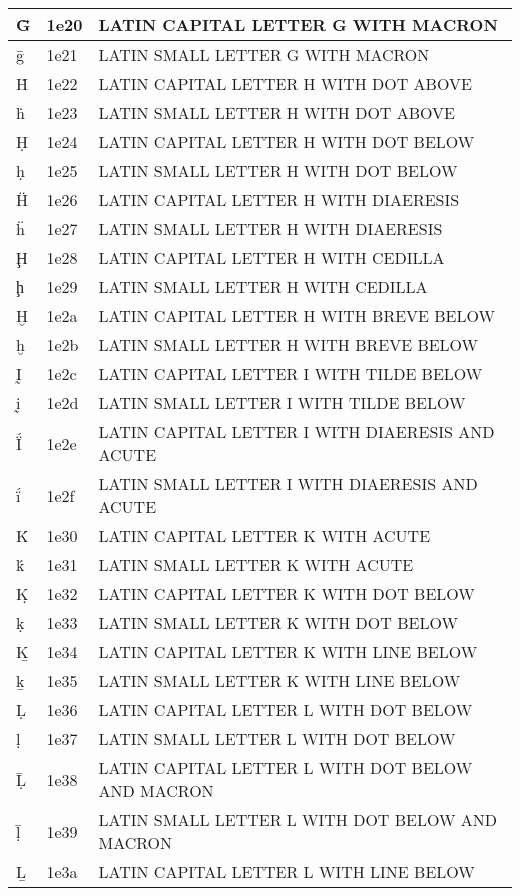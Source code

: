 \documentclass[12pt,letterpaper,openany]{book}
\begin{document}
\begin{center}
\begin{supertabular}{|m{0.25in}|m{0.5in}|m{4in}|}
Ḡ & 1e20 & LATIN CAPITAL LETTER G WITH MACRON\\\hline
ḡ & 1e21 & LATIN SMALL LETTER G WITH MACRON\\\hline
Ḣ & 1e22 & LATIN CAPITAL LETTER H WITH DOT ABOVE\\\hline
ḣ & 1e23 & LATIN SMALL LETTER H WITH DOT ABOVE\\\hline
Ḥ & 1e24 & LATIN CAPITAL LETTER H WITH DOT BELOW\\\hline
ḥ & 1e25 & LATIN SMALL LETTER H WITH DOT BELOW\\\hline
Ḧ & 1e26 & LATIN CAPITAL LETTER H WITH DIAERESIS\\\hline
ḧ & 1e27 & LATIN SMALL LETTER H WITH DIAERESIS\\\hline
Ḩ & 1e28 & LATIN CAPITAL LETTER H WITH CEDILLA\\\hline
ḩ & 1e29 & LATIN SMALL LETTER H WITH CEDILLA\\\hline
Ḫ & 1e2a & LATIN CAPITAL LETTER H WITH BREVE BELOW\\\hline
ḫ & 1e2b & LATIN SMALL LETTER H WITH BREVE BELOW\\\hline
Ḭ & 1e2c & LATIN CAPITAL LETTER I WITH TILDE BELOW\\\hline
ḭ & 1e2d & LATIN SMALL LETTER I WITH TILDE BELOW\\\hline
Ḯ & 1e2e & LATIN CAPITAL LETTER I WITH DIAERESIS AND ACUTE\\\hline
ḯ & 1e2f & LATIN SMALL LETTER I WITH DIAERESIS AND ACUTE\\\hline
Ḱ & 1e30 & LATIN CAPITAL LETTER K WITH ACUTE\\\hline
ḱ & 1e31 & LATIN SMALL LETTER K WITH ACUTE\\\hline
Ḳ & 1e32 & LATIN CAPITAL LETTER K WITH DOT BELOW\\\hline
ḳ & 1e33 & LATIN SMALL LETTER K WITH DOT BELOW\\\hline
Ḵ & 1e34 & LATIN CAPITAL LETTER K WITH LINE BELOW\\\hline
ḵ & 1e35 & LATIN SMALL LETTER K WITH LINE BELOW\\\hline
Ḷ & 1e36 & LATIN CAPITAL LETTER L WITH DOT BELOW\\\hline
ḷ & 1e37 & LATIN SMALL LETTER L WITH DOT BELOW\\\hline
Ḹ & 1e38 & LATIN CAPITAL LETTER L WITH DOT BELOW AND MACRON\\\hline
ḹ & 1e39 & LATIN SMALL LETTER L WITH DOT BELOW AND MACRON\\\hline
Ḻ & 1e3a & LATIN CAPITAL LETTER L WITH LINE BELOW\\\hline

\end{supertabular}
\end{center}
\end{document}

